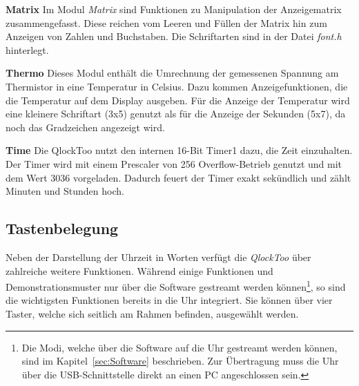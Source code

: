 \begin{multicols}{2}
\textbf{Matrix}
Im Modul \emph{Matrix} sind Funktionen zu Manipulation der Anzeigematrix zusammengefasst. Diese reichen vom Leeren und Füllen der Matrix hin zum Anzeigen von Zahlen und Buchstaben. Die Schriftarten sind in der Datei \emph{font.h} hinterlegt.

\textbf{Thermo}
Dieses Modul enthält die Umrechnung der gemessenen Spannung am Thermistor in eine Temperatur in Celsius.
Dazu kommen Anzeigefunktionen, die die Temperatur auf dem Display ausgeben.
Für die Anzeige der Temperatur wird eine kleinere Schriftart (3x5) genutzt als für die Anzeige der Sekunden (5x7), da noch das Gradzeichen angezeigt wird.

\textbf{Time}
Die QlockToo nutzt den internen 16-Bit Timer1 dazu, die Zeit einzuhalten.
Der Timer wird mit einem Prescaler von 256 Overflow-Betrieb genutzt und mit dem Wert 3036 vorgeladen.
Dadurch feuert der Timer exakt sekündlich und zählt Minuten und Stunden hoch.

\subsection*{Tastenbelegung}
Neben der Darstellung der Uhrzeit in Worten verfügt die \emph{QlockToo} über zahlreiche weitere Funktionen.
Während einige Funktionen und Demonstrationsmuster nur über die Software gestreamt werden können\footnote{Die Modi, welche über die Software auf die Uhr gestreamt werden können, sind im Kapitel~\ref{sec:Software} beschrieben.
Zur Übertragung muss die Uhr über die USB-Schnittstelle direkt an einen PC angeschlossen sein.}, so sind die wichtigsten Funktionen bereits in die Uhr integriert.
Sie können über vier Taster, welche sich seitlich am Rahmen befinden, ausgewählt werden.


\end{multicols}
